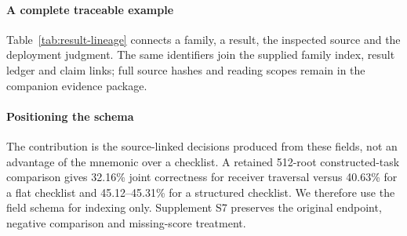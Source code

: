 \paragraph{A complete traceable example}
Table~\ref{tab:result-lineage} connects a family, a result, the inspected source and the deployment judgment. The same identifiers join the supplied family index, result ledger and claim links; full source hashes and reading scopes remain in the companion evidence package.


\paragraph{Positioning the schema}
The contribution is the source-linked decisions produced from these fields, not an advantage of the mnemonic over a checklist. A retained 512-root constructed-task comparison gives 32.16\% joint correctness for receiver traversal versus 40.63\% for a flat checklist and 45.12--45.31\% for a structured checklist. We therefore use the field schema for indexing only. Supplement S7 preserves the original endpoint, negative comparison and missing-score treatment.

